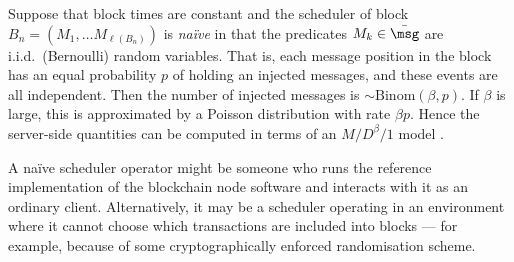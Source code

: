 \documentclass[a4paper,11pt]{article}
\begin{document}
\begin{example}
\label{naive-scheduler}

  Suppose that block times are constant and the scheduler of block $B_n=(M_1,\ldots M_{\ell(B_n)})$ is \emph{na\"ive} in that the predicates $M_k\in \bar\msg$ are i.i.d.~(Bernoulli) random variables.
  That is, each message position in the block has an equal probability $p$ of holding an injected messages, and these events are all independent.
  Then the number of injected messages is $\sim\mathrm{Binom}(\beta,p)$.
  If $\beta$ is large, this is approximated by a Poisson distribution with rate $\beta p$.
  Hence the server-side quantities can be computed in terms of an $M/D^\beta/1$ model \cite{bailey1954queueing}.
  
  A na\"ive scheduler operator might be someone who runs the reference implementation of the blockchain node software and interacts with it as an ordinary client.
  Alternatively, it may be a scheduler operating in an environment where it cannot choose which transactions are included into blocks --- for example, because of some cryptographically enforced randomisation scheme.
  
\end{example}

\begin{comment}
\begin{example}[Frontrunning scheduler]

  If the scheduler inserts all injected messages at the start of the block, then the max entropy distribution for number of inserted messages given a fixed mean $\nu$ is geometric with failure probability $(\nu+1)^{-1}$.
  Suppose block times are exponentially distributed $\sim \tau$ with rate $\mu$.
  Then the number of arrivals of a Poisson process with rate $\lambda$ in one block interval is geometrically distributed with failure probability $\frac{\lambda\mu}{\lambda\mu + 1}$.

\end{example}

\begin{example}[Not so naive scheduler]

  In reality, not all block positions are made equal. 
  Some --- such as the first few positions --- may be in higher demand.
  For example, the first arbitrageur in the block has a unique opportunity to bring onchain markets into equilibrium with real-time markets.

\end{example}
\end{comment}
\end{document}
